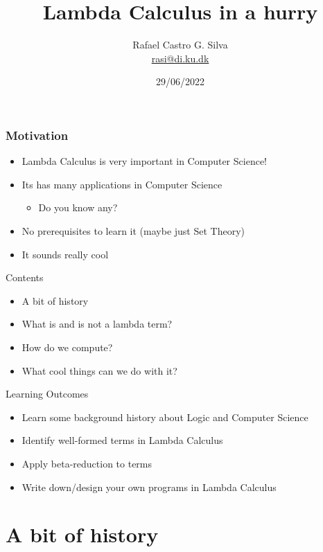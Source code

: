 \documentclass[aspectratio=169,10pt]{beamer}
\title[Lambda Calculus in a hurry]{Lambda Calculus in a hurry}
\author[Rafael Castro]{
  Rafael Castro G. Silva\\\medskip
  {\small \url{rasi@di.ku.dk}}}
\date{29/06/2022}
\institute[UCPH]{
  Department of Computer Science \\
  University of Copenhagen}
\begin{document}
\begin{frame}
  \titlepage

\end{frame}

\begin{frame}[fragile]
  \frametitle{Motivation}
  \begin{itemize}
    \item Lambda Calculus is very important in Computer Science!
          \pause
    \item Its has many applications in Computer Science
          \begin{itemize}
            \item Do you know any?
          \end{itemize}
          \pause
    \item No prerequisites to learn it (maybe just Set Theory)
          \pause
    \item It sounds really cool
  \end{itemize}
\end{frame}

\begin{frame}{Contents}
  \begin{itemize}
    \item A bit of history
    \item What is and is not a lambda term?
    \item How do we compute?
    \item What cool things can we do with it?
  \end{itemize}
\end{frame}

\begin{frame}{Learning Outcomes}
  \begin{itemize}
    \item Learn some background history about Logic and Computer Science
    \item Identify well-formed terms in Lambda Calculus
    \item Apply beta-reduction to terms
    \item Write down/design your own programs in Lambda Calculus
  \end{itemize}
\end{frame}

\section{A bit of history}
\end{document}

